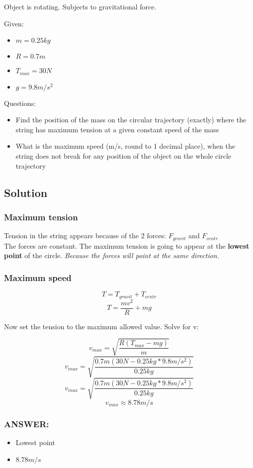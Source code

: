 
Object is rotating. Subjects to gravitational force.


\bigbreak Given: 
\begin{itemize}
    \item $  m  = 0.25kg $
    \item $ R = 0.7m $
    \item $ T_{max} = 30N $
    \item $ g = 9.8m/s^2 $
\end{itemize}


\bigbreak Questions:
\begin{itemize}
    \item Find the position of the mass on the circular trajectory (exactly) where the string has
    maximum tension at a given constant speed of the mass
    \item What is the maximum speed (m/s, round to 1 decimal place), when the string does not
    break for any position of the object on the whole circle trajectory
\end{itemize}

\subsection*{Solution}
\subsubsection*{Maximum tension}
Tension in the string appears because of the 2 forces: $F_{gravit}$ and $F_{centr}$ \\
The forces are constant. The maximum tension is going to appear at the \textbf{lowest point} of the circle.
\textit{Because the forces will point at the same direction.}


\subsubsection*{Maximum speed}
$$ T = T_{gravit} + T_{centr} $$
$$ T = \frac{mv^2}{R} + mg $$

Now set the tension to the maximum allowed value. Solve for v:

$$  v_{max} =  \sqrt{\frac{R(T_{max} - mg)}{m}} $$
$$  v_{max} =  \sqrt{\frac{0.7m(30N - 0.25kg * 9.8m/s^2)}{0.25kg}} $$
$$  v_{max} =  \sqrt{\frac{0.7m(30N - 0.25kg * 9.8m/s^2)}{0.25kg}} $$
$$  v_{max} \approx  \boxed{8.78m/s} $$

\hfill \subsubsection*{ANSWER:}

\begin{itemize}
    \item Lowest point
    \item $8.78m/s$
\end{itemize}



